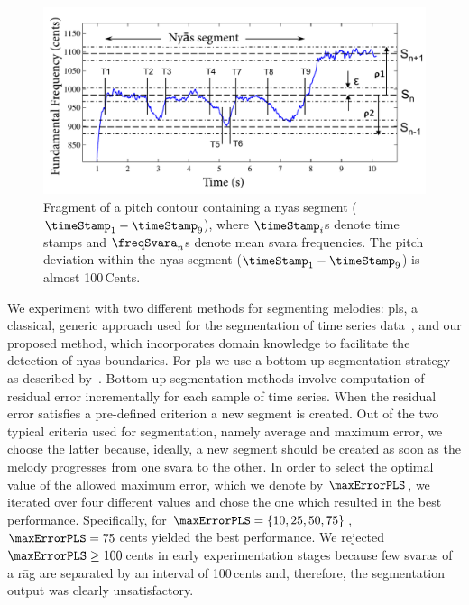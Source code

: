 {\begin{figure}
	\begin{center}
		\includegraphics[width=\figSizeNinety]{ch05_preprocessing/figures/NyasSegmentationMethod.pdf}
	\end{center}
	\caption{Fragment of a pitch contour containing a \gls{nyas} segment ($\timeStamp_1-\timeStamp_9$), where $\timeStamp_i$s denote time stamps and $\freqSvara_n$s denote mean \gls{svara} frequencies. The pitch deviation within the \gls{nyas} segment ($\timeStamp_1-\timeStamp_9$) is almost 100\,Cents.}
	\label{fig:nyas_segmentation_illustration}
\end{figure}

We experiment with two different methods for segmenting melodies: \gls{pls}, a classical, generic approach used for the segmentation of time series data~\citep{keogh2004segmenting}, and our proposed method, which incorporates domain knowledge to facilitate the detection of \gls{nyas} boundaries. For \gls{pls} we use a bottom-up segmentation strategy as described by~\cite{keogh2004segmenting}. Bottom-up segmentation methods involve computation of residual error incrementally for each sample of time series. When the residual error satisfies a pre-defined criterion a new segment is created. Out of the two typical criteria used for segmentation, namely average and maximum error, we choose the latter because, ideally, a new segment should be created as soon as the melody progresses from one \gls{svara} to the other. In order to select the optimal value of the allowed maximum error, which we denote by $\maxErrorPLS$, we iterated over four different values and chose the one which resulted in the best performance. Specifically, for $\maxErrorPLS=\lbrace 10, 25, 50, 75\rbrace$, $\maxErrorPLS=75$\,cents yielded the best performance. We rejected $\maxErrorPLS\geq 100$\,cents in early experimentation stages because few \glspl{svara} of a r\={a}g are separated by an interval of 100\,cents and, therefore, the segmentation output was clearly unsatisfactory.

}
